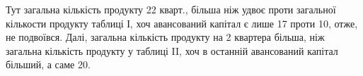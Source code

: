 \noindent{}Тут загальна кількість продукту \deq{} 22 кварт., більша ніж удвоє проти
загальної кількости продукту таблиці І, хоч авансований капітал є лише 17 проти 10, отже, не подвоївся. Далі, загальна кількість продукту
на 2 квартера більша, ніж загальна кількість продукту у таблиці II, хоч
в останній авансований капітал більший, а саме 20.
